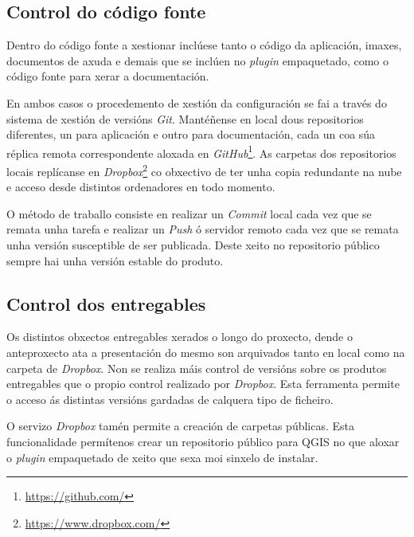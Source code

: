 \subsection{Control do código fonte}
Dentro do código fonte a xestionar inclúese tanto o código da aplicación, imaxes, documentos de axuda e demais que se inclúen no \emph{plugin} empaquetado, como o código fonte para xerar a documentación.

En ambos casos o procedemento de xestión da configuración se fai a través do sistema de xestión de versións \emph{Git}. Mantéñense en local dous repositorios diferentes, un para aplicación e outro para documentación, cada un coa súa réplica remota correspondente aloxada en \emph{GitHub}\footnote{\url{https://github.com/}}. As carpetas dos repositorios locais replícanse en \emph{Dropbox}\footnote{\url{https://www.dropbox.com/}} co obxectivo de ter unha copia redundante na nube e acceso desde distintos ordenadores en todo momento.

O método de traballo consiste en realizar un \emph{Commit} local cada vez que se remata unha tarefa e realizar un \emph{Push} ó servidor remoto cada vez que se remata unha versión susceptible de ser publicada. Deste xeito no repositorio público sempre hai unha versión estable do produto.

\subsection{Control dos entregables}
Os distintos obxectos entregables xerados o longo do proxecto, dende o anteproxecto ata a presentación do mesmo son arquivados tanto en local como na carpeta de \emph{Dropbox}. Non se realiza máis control de versións sobre os produtos entregables que o propio control realizado por \emph{Dropbox}. Esta ferramenta permite o acceso ás distintas versións gardadas de calquera tipo de ficheiro.

O servizo \emph{Dropbox} tamén permite a creación de carpetas públicas. Esta funcionalidade permítenos crear un repositorio público para QGIS no que aloxar o \emph{plugin} empaquetado de xeito que sexa moi sinxelo de instalar.